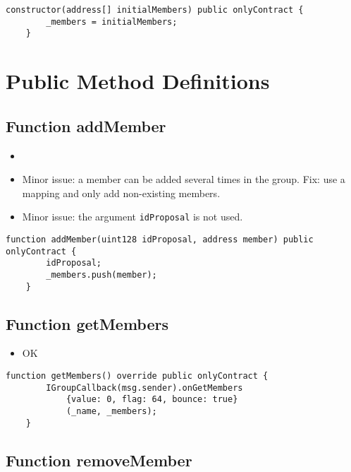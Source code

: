 \begin{lstlisting}[firstnumber=15]
    constructor(address[] initialMembers) public onlyContract {
        _members = initialMembers;
    }
\end{lstlisting}

\section{Public Method Definitions}


\subsection{Function addMember}

\begin{itemize}
\item {}
\item Minor issue: a member can be added several times in the
  group. Fix: use a mapping and only add non-existing members.
\item Minor issue: the argument {\tt idProposal} is not used.
\end{itemize}

\begin{lstlisting}[firstnumber=25]
    function addMember(uint128 idProposal, address member) public onlyContract {
        idProposal;
        _members.push(member);
    }
\end{lstlisting}

\subsection{Function getMembers}

\begin{itemize}
\item OK
\end{itemize}

\begin{lstlisting}[firstnumber=19]
    function getMembers() override public onlyContract {
        IGroupCallback(msg.sender).onGetMembers
            {value: 0, flag: 64, bounce: true}
            (_name, _members);
    }
\end{lstlisting}

\subsection{Function removeMember}


